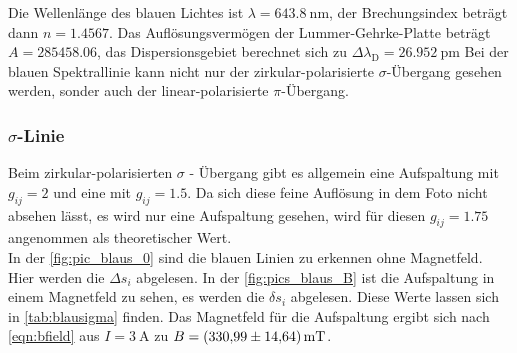  \noindent Die Wellenlänge des blauen Lichtes ist $\lambda = \SI{643.8}{\nano\metre}$, der Brechungsindex beträgt dann $n = \num{1.4567}$. 
  Das Auflösungsvermögen der Lummer-Gehrke-Platte beträgt $A = \num{285458.06}$, das Dispersionsgebiet berechnet sich zu $\Delta \lambda_\text{D} = \SI{26.952}{\pico\metre}$
  Bei der blauen Spektrallinie kann nicht nur der zirkular-polarisierte $\sigma$-Übergang gesehen werden, sonder auch der linear-polarisierte 
  $\pi$-Übergang. 

  \subsubsection{\texorpdfstring{$\sigma$}{}-Linie}

    \noindent 
    Beim zirkular-polarisierten $\sigma$ - Übergang gibt es allgemein eine Aufspaltung mit $g_{ij} = \num{2}$ und eine mit $g_{ij} = \num{1.5}$. 
    Da sich diese feine Auflösung in dem Foto nicht absehen lässt, es wird nur eine Aufspaltung gesehen, wird für diesen $g_{ij} = \num{1.75}$ angenommen 
    als theoretischer Wert. \\ 
    In der \autoref{fig:pic_blaus_0} sind die blauen Linien zu erkennen ohne Magnetfeld. Hier werden die $\Delta s_i$ abgelesen. In der \autoref{fig:pics_blaus_B} 
    ist die Aufspaltung in einem Magnetfeld zu sehen, es werden die $\delta s_i$ abgelesen. Diese Werte lassen sich in \autoref{tab:blausigma} finden. 
    Das Magnetfeld für die Aufspaltung ergibt sich nach \eqref{eqn:bfield} aus $I = \SI{3}{\ampere}$ zu $B = \SI{330.99 (1464)}{\milli\tesla}$. 

